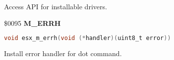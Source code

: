 Access API for installable drivers.

%
%
%
%

\$0095 \textbf{M\_ERRH}

\begin{lstlisting}[language=C]
void esx_m_errh(void (*handler)(uint8_t error))
\end{lstlisting}

Install error handler for dot command.\\

%

